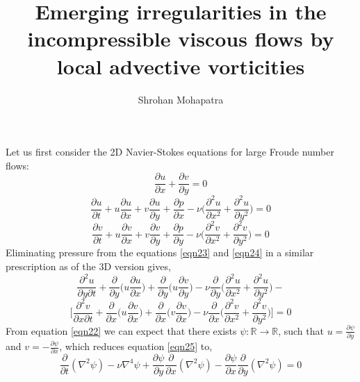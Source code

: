 \documentclass{article}
\title{Emerging irregularities in the incompressible viscous flows by local advective vorticities}
\author{Shrohan Mohapatra}
\begin{document}
\maketitle
Let us first consider the 2D Navier-Stokes equations for large Froude number flows:
\begin{equation} \label{eqn22}
\frac{\partial u}{\partial x} + \frac{\partial v}{\partial y} = 0
\end{equation}
\begin{equation} \label{eqn23}
\frac{\partial u}{\partial t} + u \frac{\partial u}{\partial x} + v \frac{\partial u}{\partial y} + \frac{\partial p}{\partial x} - \nu \bigg(\frac{\partial^2 u}{\partial x^2} +\frac{\partial^2 u}{\partial y^2}\bigg) = 0
\end{equation}
\begin{equation} \label{eqn24}
\frac{\partial v}{\partial t} + u \frac{\partial v}{\partial x} + v \frac{\partial v}{\partial y} + \frac{\partial p}{\partial y} - \nu \bigg(\frac{\partial^2 v}{\partial x^2} +\frac{\partial^2 v}{\partial y^2}\bigg) = 0
\end{equation}
Eliminating pressure from the equations \ref{eqn23} and \ref{eqn24} in a similar prescription as of the 3D version gives,
\begin{equation*}
\frac{\partial^2 u}{\partial y \partial t} + \frac{\partial}{\partial y}\bigg(u \frac{\partial u}{\partial x}\bigg) + \frac{\partial}{\partial y}\bigg(u \frac{\partial v}{\partial y}\bigg) - \nu\frac{\partial}{\partial y}\bigg(\frac{\partial^2 u}{\partial x^2}+\frac{\partial^2 u}{\partial y^2}\bigg) - 
\end{equation*}
\begin{equation} \label{eqn25}
\bigg[\frac{\partial^2 v}{\partial x \partial t} + \frac{\partial}{\partial x}\bigg(u \frac{\partial v}{\partial x}\bigg) + \frac{\partial}{\partial x}\bigg(v \frac{\partial v}{\partial x}\bigg) - \nu\frac{\partial}{\partial x}\bigg(\frac{\partial^2 v}{\partial x^2}+\frac{\partial^2 v}{\partial y^2}\bigg)\bigg] = 0
\end{equation}
From equation \ref{eqn22} we can expect that there exists $\psi : \mathbb{R} \to \mathbb{R}$, such that $u = \frac{\partial \psi}{\partial y}$ and $v = -\frac{\partial \psi}{\partial x}$, which reduces  equation \ref{eqn25} to,
\begin{equation*}
\frac{\partial}{\partial t}(\nabla^2 \psi) - \nu \nabla^4 \psi + \frac{\partial \psi}{\partial y} \frac{\partial}{\partial x}(\nabla^2 \psi) - \frac{\partial \psi}{\partial x} \frac{\partial}{\partial y}(\nabla^2 \psi) = 0
\end{equation*}
\end{document}
